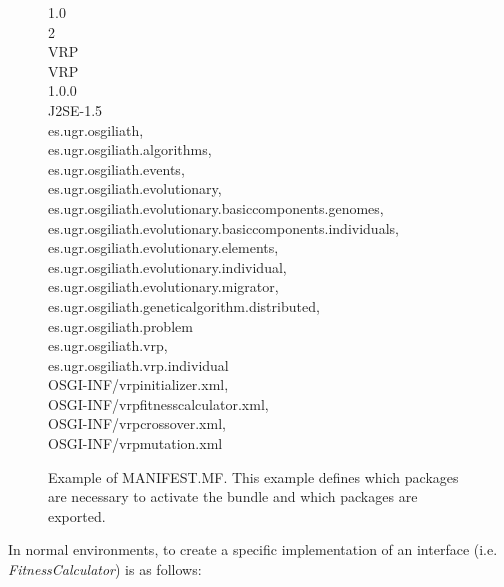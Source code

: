 \documentclass{sig-alternate}
\begin{document}
\begin{figure}[t]
\noindent
\ttfamily
{} 1.0\\
 2\\
 VRP\\
 VRP\\
 1.0.0\\
 J2SE-1.5\\
  es.ugr.osgiliath,\\
 \hlstd{}  es.ugr.osgiliath.algorithms,\\
\hlstd{} es.ugr.osgiliath.events,\\
 \hlstd{}es.ugr.osgiliath.evolutionary,\\
 \hlstd{}es.ugr.osgiliath.evolutionary.basiccomponents.genomes,\\
 \hlstd{}es.ugr.osgiliath.evolutionary.basiccomponents.individuals,\\
 \hlstd{}es.ugr.osgiliath.evolutionary.elements,\\
 \hlstd{}es.ugr.osgiliath.evolutionary.individual,\\
 \hlstd{}es.ugr.osgiliath.evolutionary.migrator,\\
 \hlstd{}es.ugr.osgiliath.geneticalgorithm.distributed,\\
 \hlstd{}es.ugr.osgiliath.problem\\
 es.ugr.osgiliath.vrp,\\
 \hlstd{}es.ugr.osgiliath.vrp.individual\\
\hlstd{} OSGI-INF/vrpinitializer.xml,\\
OSGI-INF/vrpfitnesscalculator.xml,\\
 OSGI-INF/vrpcrossover.xml,\\
 OSGI-INF/vrpmutation.xml\\
\mbox{}
 
\normalfont
\caption{Example of MANIFEST.MF. This example defines which packages are necessary to activate the bundle and which packages are exported.}
\label{fig:manifest}
\end {figure}





In normal environments, to create a specific implementation of an interface (i.e. {\em FitnessCalculator}) is as follows:
\end{document}

